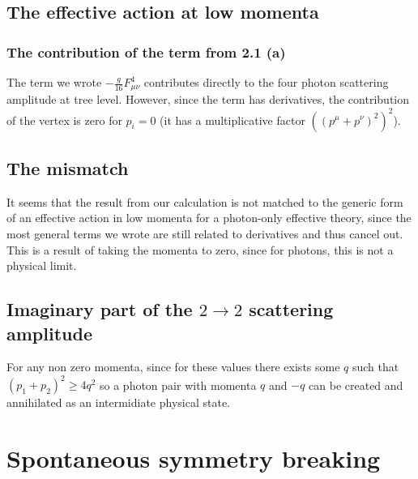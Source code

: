 \documentclass{article}
\begin{document}
\subsection{The effective action at low momenta}
\subsubsection{The contribution of the term from 2.1 (a)}
The term we wrote $-\frac{g}{16}F_{\mu\nu}^4$ contributes directly to the four photon scattering amplitude at tree level. However, since the term has derivatives, the contribution of the vertex is zero for $p_i = 0$ (it has a multiplicative factor $((p^\mu + p^\nu)^2)^2$).
\subsection{The mismatch}
It seems that the result from our calculation is not matched to the generic form of an effective action in low momenta for a photon-only effective theory, since the most general terms we wrote are still related to derivatives and thus cancel out.
\newline
This is a result of taking the momenta to zero, since for photons, this is not a physical limit. 
\subsection{Imaginary part of the $2 \rightarrow 2$ scattering amplitude}
For any non zero momenta, since for these values there exists some $q$ such that $(p_1 + p_2)^2 \ge 4q^2$ so a photon pair with momenta $q$ and $-q$ can be created and annihilated as an intermidiate physical state. 
\newpage
\section{Spontaneous symmetry breaking}
\end{document}

